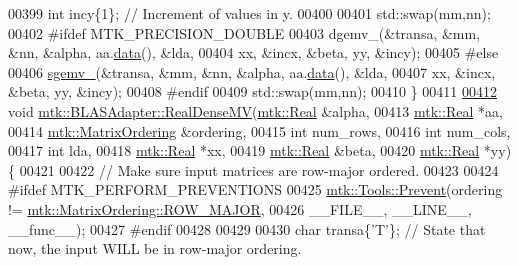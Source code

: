 \begin{DoxyCode}
00399   \textcolor{keywordtype}{int} incy\{1\};                            \textcolor{comment}{// Increment of values in y.}
00400 
00401   std::swap(mm,nn);
00402 \textcolor{preprocessor}{  #ifdef MTK\_PRECISION\_DOUBLE}
00403   dgemv\_(&transa, &mm, &nn, &alpha, aa.\hyperlink{classmtk_1_1DenseMatrix_a0c33b8a9e01d157c61ddbdf807c25d84}{data}(), &lda,
00404          xx, &incx, &beta, yy, &incy);
00405 \textcolor{preprocessor}{  #else}
00406   \hyperlink{namespacemtk_a88daff7ad6f251a58b94aa2d0c94d069}{sgemv\_}(&transa, &mm, &nn, &alpha, aa.\hyperlink{classmtk_1_1DenseMatrix_a0c33b8a9e01d157c61ddbdf807c25d84}{data}(), &lda,
00407         xx, &incx, &beta, yy, &incy);
00408 \textcolor{preprocessor}{  #endif}
00409   std::swap(mm,nn);
00410 \}
00411 
\hypertarget{mtk__blas__adapter_8cc_source_l00412}{}\hyperlink{classmtk_1_1BLASAdapter_a368b0d9871129d5139f18d46e14e4ccb}{00412} \textcolor{keywordtype}{void} \hyperlink{classmtk_1_1BLASAdapter_afdcac059a4294287cb55638221220646}{mtk::BLASAdapter::RealDenseMV}(\hyperlink{group__c01-roots_gac080bbbf5cbb5502c9f00405f894857d}{mtk::Real} &alpha,
00413                                    \hyperlink{group__c01-roots_gac080bbbf5cbb5502c9f00405f894857d}{mtk::Real} *aa,
00414                                    \hyperlink{group__c02-enums_ga622801bd9f912d0f976c3e383f5f581c}{mtk::MatrixOrdering} &ordering,
00415                                    \textcolor{keywordtype}{int} num\_rows,
00416                                    \textcolor{keywordtype}{int} num\_cols,
00417                                    \textcolor{keywordtype}{int} lda,
00418                                    \hyperlink{group__c01-roots_gac080bbbf5cbb5502c9f00405f894857d}{mtk::Real} *xx,
00419                                    \hyperlink{group__c01-roots_gac080bbbf5cbb5502c9f00405f894857d}{mtk::Real} &beta,
00420                                    \hyperlink{group__c01-roots_gac080bbbf5cbb5502c9f00405f894857d}{mtk::Real} *yy) \{
00421 
00422   \textcolor{comment}{// Make sure input matrices are row-major ordered.}
00423 
00424 \textcolor{preprocessor}{  #ifdef MTK\_PERFORM\_PREVENTIONS}
00425   \hyperlink{classmtk_1_1Tools_a332324c6f25e66be9dff48c5987a3b9f}{mtk::Tools::Prevent}(ordering != 
      \hyperlink{namespacemtk_ga622801bd9f912d0f976c3e383f5f581ca21541962976d7709c26e9cd8385bd648}{mtk::MatrixOrdering::ROW\_MAJOR},
00426                       \_\_FILE\_\_, \_\_LINE\_\_, \_\_func\_\_);
00427 \textcolor{preprocessor}{  #endif}
00428 
00429 
00430   \textcolor{keywordtype}{char} transa\{\textcolor{charliteral}{'T'}\}; \textcolor{comment}{// State that now, the input WILL be in row-major ordering.}

\end{DoxyCode}
